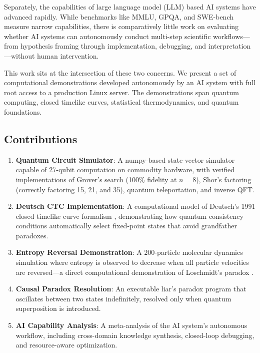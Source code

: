 \documentclass[12pt,a4paper]{article}
\begin{document}
Separately, the capabilities of large language model (LLM) based AI systems have advanced rapidly. While benchmarks like MMLU, GPQA, and SWE-bench measure narrow capabilities, there is comparatively little work on evaluating whether AI systems can autonomously conduct multi-step scientific workflows—from hypothesis framing through implementation, debugging, and interpretation—without human intervention.

This work sits at the intersection of these two concerns. We present a set of computational demonstrations developed autonomously by an AI system with full root access to a production Linux server. The demonstrations span quantum computing, closed timelike curves, statistical thermodynamics, and quantum foundations.

\subsection{Contributions}

\begin{enumerate}[label=\arabic*.]
    \item \textbf{Quantum Circuit Simulator}: A numpy-based state-vector simulator capable of 27-qubit computation on commodity hardware, with verified implementations of Grover's search (100\% fidelity at $n=8$), Shor's factoring (correctly factoring 15, 21, and 35), quantum teleportation, and inverse QFT.
    \item \textbf{Deutsch CTC Implementation}: A computational model of Deutsch's 1991 closed timelike curve formalism \cite{deutsch1991}, demonstrating how quantum consistency conditions automatically select fixed-point states that avoid grandfather paradoxes.
    \item \textbf{Entropy Reversal Demonstration}: A 200-particle molecular dynamics simulation where entropy is observed to decrease when all particle velocities are reversed—a direct computational demonstration of Loschmidt's paradox \cite{loschmidt1876}.
    \item \textbf{Causal Paradox Resolution}: An executable liar's paradox program that oscillates between two states indefinitely, resolved only when quantum superposition is introduced.
    \item \textbf{AI Capability Analysis}: A meta-analysis of the AI system's autonomous workflow, including cross-domain knowledge synthesis, closed-loop debugging, and resource-aware optimization.
\end{enumerate}
\end{document}

